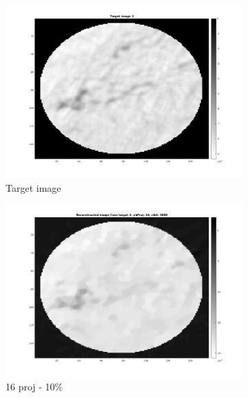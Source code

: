 \documentclass[10pt,a4paper,titlepage]{article}
\begin{document}
\begin{figure}[H]
        	
        	\begin{subfigure}[b]{0.32\textwidth}   
        	    \centering 
            	\includegraphics[width=\textwidth]{Sample3/target3.png}
            	\caption{Target image}
        	\end{subfigure}
        	\begin{subfigure}[b]{0.32\textwidth}   
        	    \centering 
        	    \includegraphics[width=\textwidth]{Sample3/L-D_5000/16_1_10.png}
        	    \caption{16 proj - 10\%}    
        	    \label{subfig:16p3L-D}
       		\end{subfigure}
        	\begin{subfigure}[b]{0.32\textwidth}  

\end{subfigure}
\end{figure}
\end{document}
